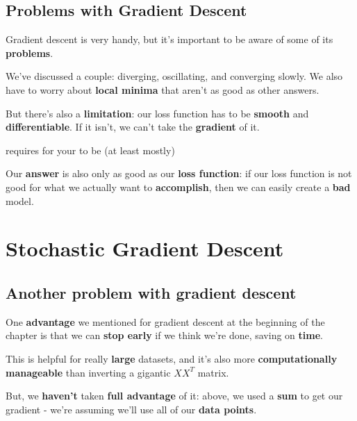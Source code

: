     
    \subsection{Problems with Gradient Descent}
        
        Gradient descent is very handy, but it's important to be aware of some of its \textbf{problems}.
        
        We've discussed a couple: diverging, oscillating, and converging slowly. We also have to worry about \textbf{local minima} that aren't as good as other answers.
        
        But there's also a \textbf{limitation}: our loss function has to be \textbf{smooth} and \textbf{differentiable}. If it isn't, we can't take the \textbf{gradient} of it.\\
        
        \begin{concept}
             requires for your  to be (at least mostly) 
        \end{concept}
        
        Our \textbf{answer} is also only as good as our \textbf{loss function}: if our loss function is not good for what we actually want to \textbf{accomplish}, then we can easily create a \textbf{bad} model.
        
\pagebreak
\section{Stochastic Gradient Descent}

    \subsection{Another problem with gradient descent}
        One \textbf{advantage} we mentioned for gradient descent at the beginning of the chapter is that we can \textbf{stop early} if we think we're done, saving on \textbf{time}.
        
        This is helpful for really \textbf{large} datasets, and it's also more \textbf{computationally manageable} than inverting a gigantic $XX^T$ matrix.
        
        But, we \textbf{haven't} taken \textbf{full advantage} of it: above, we used a \textbf{sum} to get our gradient - we're assuming we'll use all of our \textbf{data points}.
        
